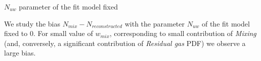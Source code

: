 \documentclass[9pt]{beamer}
\newcommand{\nologo}{\setbeamertemplate{logo}{}}
\begin{document}
{{\nologo
\begin{frame}{$N_{uw}$ parameter of the fit model fixed}

We study the bias $N_{mix} - N_{reconstructed}$ with the parameter $N_{uw}$ of the fit model fixed to $0$. For small value of $w_{mix}$, corresponding to small contribution of \textit{Mixing}  (and, conversely, a significant contribution of \textit{Residual gas} PDF) we observe a large bias.

\begin{figure}
\end{figure}
\end{frame}
}
}
\end{document}
